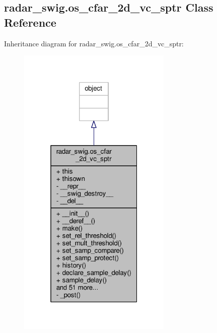 \subsection{radar\+\_\+swig.\+os\+\_\+cfar\+\_\+2d\+\_\+vc\+\_\+sptr Class Reference}
\label{classradar__swig_1_1os__cfar__2d__vc__sptr}


Inheritance diagram for radar\+\_\+swig.\+os\+\_\+cfar\+\_\+2d\+\_\+vc\+\_\+sptr\+:
\nopagebreak
\begin{figure}[H]
\begin{center}
\leavevmode
\includegraphics[width=208pt]{d6/d72/classradar__swig_1_1os__cfar__2d__vc__sptr__inherit__graph}
\end{center}
\end{figure}


